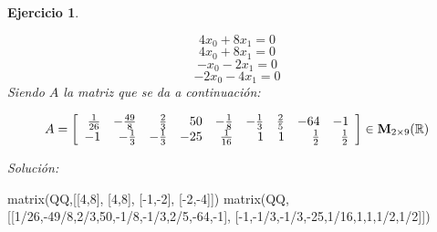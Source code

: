 \documentclass[12pt]{amsart}
\newtheorem{ejer}{Ejercicio}
\begin{document}
\begin{ejer}
\begin{minipage}{\textwidth}
\begin{tcolorbox}[colback = red!20!white,title=Versión Ecuaciones Implícitas]
\[ 4 x_{0} + 8 x_{1} = 0 \]
\[ 4 x_{0} + 8 x_{1} = 0 \]
\[ -x_{0} - 2 x_{1} = 0 \]
\[ -2 x_{0} - 4 x_{1} = 0 \]
Siendo $A$ la matriz que se da a continuación:
\end{tcolorbox}
\end{minipage}
\[ A = \left[\begin{array}{rrrrrrrrr}
\frac{1}{26} & -\frac{49}{8} & \frac{2}{3} & 50 & -\frac{1}{8} & -\frac{1}{3} & \frac{2}{5} & -64 & -1 \\
-1 & -\frac{1}{3} & -\frac{1}{3} & -25 & \frac{1}{16} & 1 & 1 & \frac{1}{2} & \frac{1}{2}
\end{array}\right] \in {\bf M}_{2\times 9}({\mathbb R})\]
\end{ejer}

{\it Soluci\'on:}

\begin{sageblock}
matrix(QQ,[[4,8],
[4,8],
[-1,-2],
[-2,-4]])
matrix(QQ,[[1/26,-49/8,2/3,50,-1/8,-1/3,2/5,-64,-1],
[-1,-1/3,-1/3,-25,1/16,1,1,1/2,1/2]])
\end{sageblock}

\end{document}
